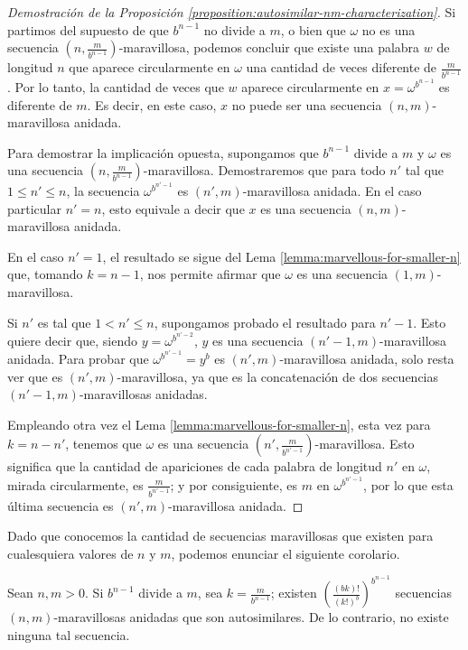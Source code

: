 \begin{proof}[Demostración de la Proposición \ref{proposition:autosimilar-nm-characterization}]
	Si partimos del supuesto de que $b^{n-1}$ no divide a $m$, o bien que
	$\omega$ no es una secuencia $\left( n, \frac{m}{b^{n-1}}
		\right)$-maravillosa,
	podemos concluir que existe una palabra $w$ de longitud $n$ que aparece
	circularmente en $\omega$ una cantidad de veces diferente de
	$\frac{m}{b^{n-1}}$.
	Por lo tanto, la cantidad de veces que $w$ aparece circularmente
	en $x = \omega^{b^{n-1}}$ es diferente de $m$.
	Es decir, en este caso, $x$ no puede ser una secuencia $(n,m)$-maravillosa
	anidada.

	Para demostrar la implicación opuesta, supongamos que $b^{n-1}$ divide a $m$
	y $\omega$ es una secuencia $\left(n, \frac{m}{b^{n-1}} \right)$-maravillosa.
	Demostraremos que para todo $n'$ tal que $1 \leq n' \leq n$, la secuencia
	$\omega^{b^{n'-1}}$ es $(n',m)$-maravillosa anidada.
	En el caso particular $n' = n$, esto equivale a decir que $x$ es una secuencia
	$(n,m)$-maravillosa anidada.

	En el caso $n' = 1$, el resultado se sigue del Lema
	\ref{lemma:marvellous-for-smaller-n} que, tomando $k = n-1$, nos permite
	afirmar que $\omega$ es una secuencia $(1,m)$-maravillosa.

	Si $n'$ es tal que $1 < n' \leq n$, supongamos probado el resultado para
	$n'-1$.
	Esto quiere decir que, siendo $y = \omega^{b^{n' - 2}}$, $y$ es una secuencia
	$(n'-1, m)$-maravillosa anidada.
	Para probar que $\omega^{b^{n' - 1}} = y^b$ es $(n',m)$-maravillosa anidada,
	solo resta ver que es $(n',m)$-maravillosa, ya que es la concatenación de dos
	secuencias $(n'-1, m)$-maravillosas anidadas.

	Empleando otra vez el Lema \ref{lemma:marvellous-for-smaller-n}, esta vez para
	$k = n - n'$, tenemos que $\omega$ es una secuencia $\left( n', \frac{m}{b^{n'
				- 1}} \right)$-maravillosa.
	Esto significa que la cantidad de apariciones de cada palabra de longitud $n'$
	en $\omega$, mirada circularmente, es $\frac{m}{b^{n' - 1}}$; y por
	consiguiente, es $m$ en $\omega^{b^{n'-1}}$, por lo que esta última secuencia
	es $(n',m)$-maravillosa anidada.
\end{proof}

Dado que conocemos la cantidad de secuencias maravillosas que existen para
cualesquiera valores de $n$ y $m$, podemos enunciar el siguiente corolario.

\begin{corollary} \label{corollary:autosimilar-nm-count}
	Sean $n, m > 0$.
	Si $b^{n-1}$ divide a $m$, sea $k = \frac{m}{b^{n-1}}$; existen
	$\left( \frac{(bk)! }{(k!)^b} \right)^{b^{n-1}}$
	secuencias $(n,m)$-maravillosas anidadas que son autosimilares.
	De lo contrario, no existe ninguna tal secuencia.
\end{corollary}

